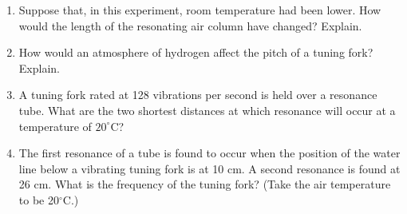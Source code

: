 \vskip35pt


\begin{enumerate}
\item Suppose that, in this experiment, room temperature had been lower. How would
the length of the resonating air column have changed? Explain. 
\vspace{20mm}

\item How would an atmosphere of hydrogen affect the pitch of a tuning fork? Explain.\vspace{20mm}

\item A tuning fork rated at 128 vibrations per second is held over a resonance tube.
What are the two shortest distances at which resonance will occur at a temperature
of $20^\circ$C?\vspace{20mm}

\item The first resonance of a tube is found to occur when the position of the water
line below a vibrating tuning fork is at 10 cm. A second resonance is found
at 26 cm. What is the frequency of the tuning fork? (Take the air temperature
to be 20$^\circ$C.)
\end{enumerate}
